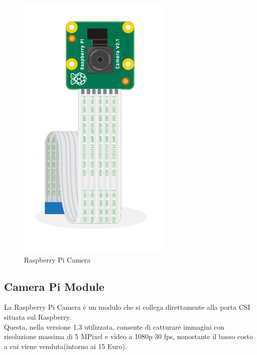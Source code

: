 \documentclass[12pt]{report}
\begin{document}
\begin{figure}
\vspace{-30pt}
\includegraphics[width=0.9\linewidth]{images/components/pi-camera.png} 
\caption{Raspberry Pi Camera}
\label{fig:wrapfig}
\vspace{30pt}
\end{figure}
\subsection*{Camera Pi Module}

La Raspberry Pi Camera è un modulo che si collega direttamente alla porta CSI situata sul Raspberry.\\Questa, nella versione 1.3 utilizzata, consente di catturare immagini con risoluzione massima di 5 MPixel e video a 1080p 30 fps, nonostante il basso costo a cui viene venduta(intorno ai 15 Euro).\\
\vspace{0.5cm}
\end{document}
